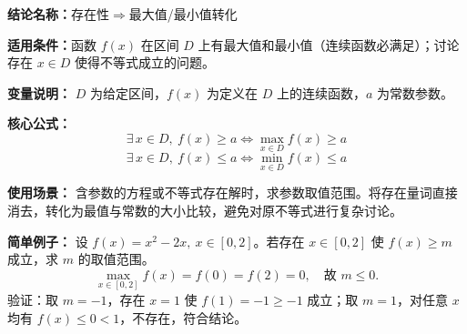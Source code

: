 \textbf{结论名称：}存在性\(\Rightarrow\)最大值/最小值转化

\textbf{适用条件：}函数 \( f(x) \) 在区间 \( D \) 上有最大值和最小值（连续函数必满足）；讨论存在 \( x\in D \) 使得不等式成立的问题。

\textbf{变量说明：} \( D \) 为给定区间，\( f(x) \) 为定义在 \( D \) 上的连续函数，\( a \) 为常数参数。

\textbf{核心公式：}
\[
\boxed{\exists\, x\in D,\ f(x)\ge a \iff \max_{x\in D}f(x)\ge a}
\]
\[
\boxed{\exists\, x\in D,\ f(x)\le a \iff \min_{x\in D}f(x)\le a}
\]

\textbf{使用场景：} 含参数的方程或不等式存在解时，求参数取值范围。将存在量词直接消去，转化为最值与常数的大小比较，避免对原不等式进行复杂讨论。

\textbf{简单例子：} 设 \( f(x)=x^2-2x,\ x\in[0,2] \)。若存在 \( x\in[0,2] \) 使 \( f(x)\ge m \) 成立，求 \( m \) 的取值范围。
\[
\max_{x\in[0,2]}f(x)=f(0)=f(2)=0,\quad \text{故 } m\le 0.
\]
验证：取 \( m=-1 \)，存在 \( x=1 \) 使 \( f(1)=-1\ge -1 \) 成立；取 \( m=1 \)，对任意 \( x \) 均有 \( f(x)\le 0<1 \)，不存在，符合结论。